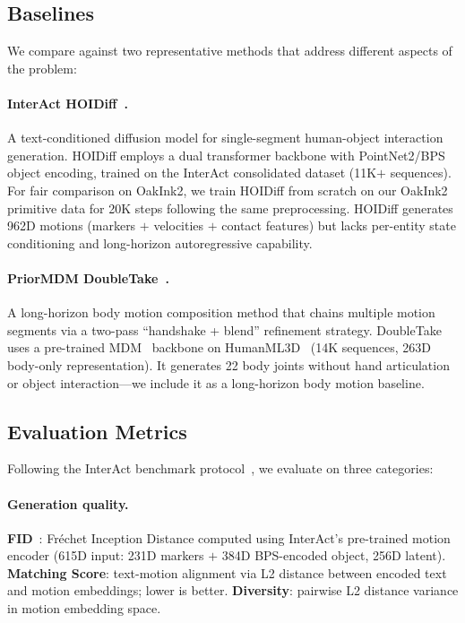 \subsection{Baselines}
\label{sec:baselines}

We compare against two representative methods that address different aspects of the problem:

\paragraph{InterAct HOIDiff~\cite{xu2025interact}.}
A text-conditioned diffusion model for single-segment human-object interaction generation.
HOIDiff employs a dual transformer backbone with PointNet2/BPS object encoding, trained on the InterAct consolidated dataset (11K$+$ sequences).
For fair comparison on OakInk2, we train HOIDiff from scratch on our OakInk2 primitive data for 20K steps following the same preprocessing.
HOIDiff generates 962D motions (markers $+$ velocities $+$ contact features) but lacks per-entity state conditioning and long-horizon autoregressive capability.

\paragraph{PriorMDM DoubleTake~\cite{shafir2024priormdm}.}
A long-horizon body motion composition method that chains multiple motion segments via a two-pass ``handshake + blend'' refinement strategy.
DoubleTake uses a pre-trained MDM~\cite{tevet2023human} backbone on HumanML3D~\cite{guo2022generating} (14K sequences, 263D body-only representation).
It generates 22 body joints without hand articulation or object interaction---we include it as a long-horizon body motion baseline.


\subsection{Evaluation Metrics}
\label{sec:metrics}

Following the InterAct benchmark protocol~\cite{xu2025interact}, we evaluate on three categories:

\paragraph{Generation quality.}
\textbf{FID}~\cite{heusel2017gans}: Fr\'{e}chet Inception Distance computed using InterAct's pre-trained motion encoder (615D input: 231D markers $+$ 384D BPS-encoded object, 256D latent).
\textbf{Matching Score}: text-motion alignment via L2 distance between encoded text and motion embeddings; lower is better.
\textbf{Diversity}: pairwise L2 distance variance in motion embedding space.

